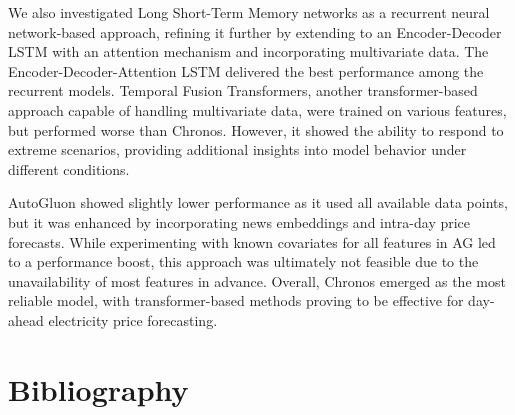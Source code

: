 \documentclass[a4paper]{article}
\begin{document}
We also investigated Long Short-Term Memory networks as a recurrent
neural network-based approach, refining it further by extending to an
Encoder-Decoder LSTM with an attention mechanism and incorporating
multivariate data. The Encoder-Decoder-Attention LSTM delivered the best
performance among the recurrent models. Temporal Fusion Transformers,
another transformer-based approach capable of handling multivariate
data, were trained on various features, but performed worse than
Chronos. However, it showed the ability to respond to extreme scenarios,
providing additional insights into model behavior under different
conditions.

AutoGluon showed slightly lower performance as it used all available
data points, but it was enhanced by incorporating news embeddings and
intra-day price forecasts. While experimenting with known covariates for
all features in AG led to a performance boost, this approach was
ultimately not feasible due to the unavailability of most features in
advance. Overall, Chronos emerged as the most reliable model, with
transformer-based methods proving to be effective for day-ahead
electricity price forecasting.

    \newpage
\section{Bibliography}\label{bibliography}
\end{document}
